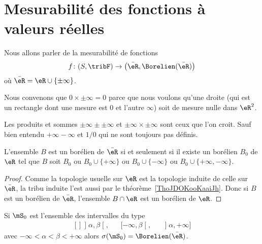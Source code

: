 \section{Mesurabilité des fonctions à valeurs réelles}

Nous allons parler de la mesurabilité de fonctions
\begin{equation}
	f\colon (S,\tribF)\to \big( \bar \eR,\Borelien(\bar \eR) \big)
\end{equation}
où \( \bar \eR=\eR\cup\{ \pm\infty \}\).

\begin{normaltext}      \label{normooGAAJooUPCbzG}
	Nous convenons que \( 0\times\pm\infty=0\) parce que nous voulons qu'une droite (qui est un rectangle dont une mesure est \( 0\) et l'autre \( \infty\)) soit de mesure nulle dans \( \eR^2\).

	Les produits et sommes \( \pm\infty\pm\pm\infty\) et \( \pm\infty\times \pm\infty\) sont ceux que l'on croit. Sauf bien entendu \( +\infty-\infty\) et \( 1/0\) qui ne sont toujours pas définis.
\end{normaltext}

\begin{lemma}       \label{LEMooBLOLooAdNViv}
	L'ensemble \( B\) est un borélien de \( \bar \eR\) si et seulement si il existe un borélien \( B_0\) de \( \eR\) tel que \( B\) soit \( B_0\) ou \( B_0\cup\{ +\infty \}\) ou \( B_0\cup\{ -\infty \}\) ou \( B_0\cup\{ +\infty,-\infty \}\).
\end{lemma}

\begin{proof}
	Comme la topologie usuelle sur \( \eR\) est la topologie induite de celle sur \( \bar \eR\), la tribu induite l'est aussi par le théorème~\ref{ThoJDOKooKaaiJh}. Donc si \( B\) est un borélien de \( \bar \eR\), l'ensemble \( B\cap \eR\) est un borélien de \( \eR\).
\end{proof}

\begin{lemma}       \label{LemooCRVJooQosHPq}
	Si \( \mS_0\) est l'ensemble des intervalles du type
	\begin{equation}
		\begin{aligned}[]
			\mathopen] \alpha , \beta \mathclose[, &  & \mathopen[ -\infty , \beta \mathclose[, &  & \mathopen] \alpha , +\infty \mathclose]
		\end{aligned}
	\end{equation}
	avec \( -\infty<\alpha<\beta<+\infty\) alors \( \sigma(\mS_0)=\Borelien(\bar\eR)\).
\end{lemma}

